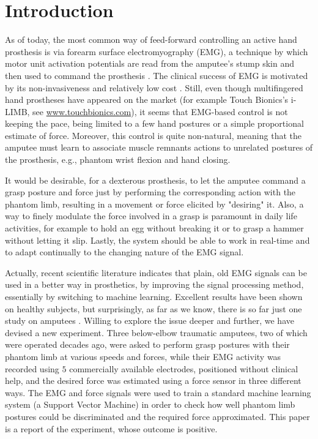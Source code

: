 \documentclass[review,authoryear]{elsarticle}
\renewcommand{\cite}{\citep}
\begin{document}
\section{Introduction}
\label{sec:intro}

As of today, the most common way of feed-forward controlling an active
hand prosthesis is via forearm surface electromyography (EMG),
a technique by which motor unit activation potentials are read from the
amputee's stump skin and then used to command the prosthesis \cite{deluca97}.
The clinical success of EMG is motivated by its non-invasiveness and
relatively low cost \cite{englehart06}.
Still, even though multifingered hand prostheses have appeared on the market
(for example Touch Bionics's i-LIMB, see \url{www.touchbionics.com}),
it seems that EMG-based control is not keeping the pace, being limited to a
few hand postures or a simple proportional estimate of force.
Moreover, this control is quite non-natural, meaning that the amputee must
learn to associate muscle remnants actions to unrelated postures of the
prosthesis, e.g., phantom wrist flexion and hand closing.

It would be desirable, for a dexterous prosthesis, to let the amputee command a
grasp posture and force just by performing the corresponding action with the
phantom limb, resulting in a movement or force elicited by "desiring"
it. Also, a way to finely modulate the force involved in a grasp is paramount
in daily life activities, for example to hold an egg without breaking it or to
grasp a hammer without letting it slip. Lastly, the system should be able to
work in real-time and to adapt continually to the changing nature of the EMG
signal.

Actually, recent scientific literature indicates that plain, old EMG signals
can be used in a better way in prosthetics, by improving the signal processing
method, essentially by switching to machine learning. Excellent results have
been shown on healthy subjects, but surprisingly, as far as we know, there is
so far just one study on amputees \cite{sebelius}. Willing to explore the issue
deeper and further, we have devised a new experiment. Three below-elbow traumatic
amputees, two of which were operated decades ago, were asked to perform
grasp postures with their phantom limb at various speeds and forces, while their
EMG activity was recorded using $5$ commercially available electrodes, positioned
without clinical help, and the desired force was
estimated using a force sensor in three different ways.
The EMG and force signals were used to train a standard machine learning system
(a Support Vector Machine) in order to check how well phantom limb postures
could be discriminated and the required force approximated. This paper is
a report of the experiment, whose outcome is positive.
\end{document}

